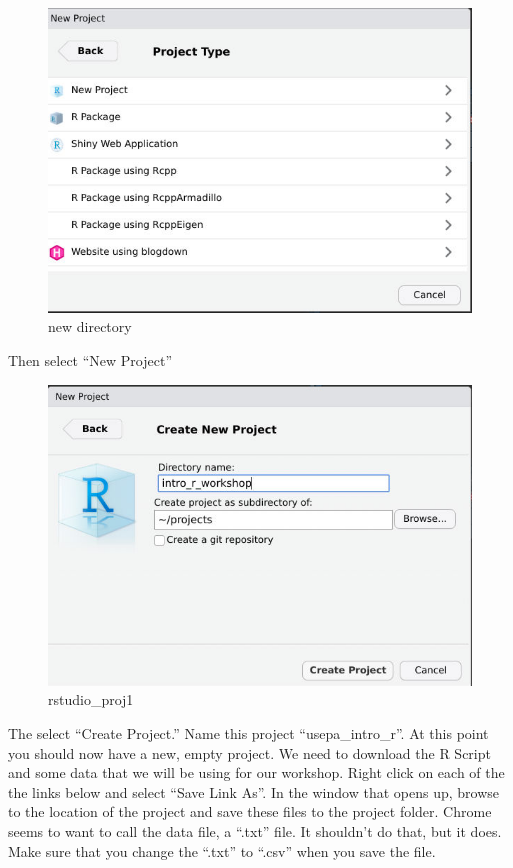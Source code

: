 \documentclass[]{article}
\begin{document}
\begin{figure}
\centering
\includegraphics{figures/rstudio_project_new.jpg}
\caption{new directory}
\end{figure}

Then select ``New Project''

\begin{figure}
\centering
\includegraphics{figures/rstudio_project_new2.jpg}
\caption{rstudio\_proj1}
\end{figure}

The select ``Create Project.'' Name this project ``usepa\_intro\_r''. At
this point you should now have a new, empty project. We need to download
the R Script and some data that we will be using for our workshop. Right
click on each of the the links below and select ``Save Link As''. In the
window that opens up, browse to the location of the project and save
these files to the project folder. Chrome seems to want to call the data
file, a ``.txt'' file. It shouldn't do that, but it does. Make sure that
you change the ``.txt'' to ``.csv'' when you save the file.
\end{document}
